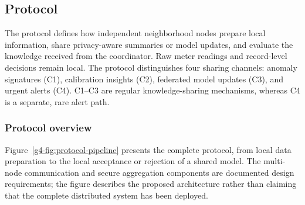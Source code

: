 \subsection{Protocol}
\label{g4-subsec:protocol}

The protocol defines how independent neighborhood nodes prepare local
information, share privacy-aware summaries or model updates, and evaluate
the knowledge received from the coordinator. Raw meter readings and
record-level decisions remain local. The protocol distinguishes four
sharing channels: anomaly signatures (C1), calibration insights (C2),
federated model updates (C3), and urgent alerts (C4). C1--C3 are regular
knowledge-sharing mechanisms, whereas C4 is a separate, rare alert path.

\subsubsection{Protocol overview}

Figure~\ref{g4-fig:protocol-pipeline} presents the complete protocol, from
local data preparation to the local acceptance or rejection of a shared
model. The multi-node communication and secure aggregation components
are documented design requirements; the figure describes the proposed
architecture rather than claiming that the complete distributed system
has been deployed.


